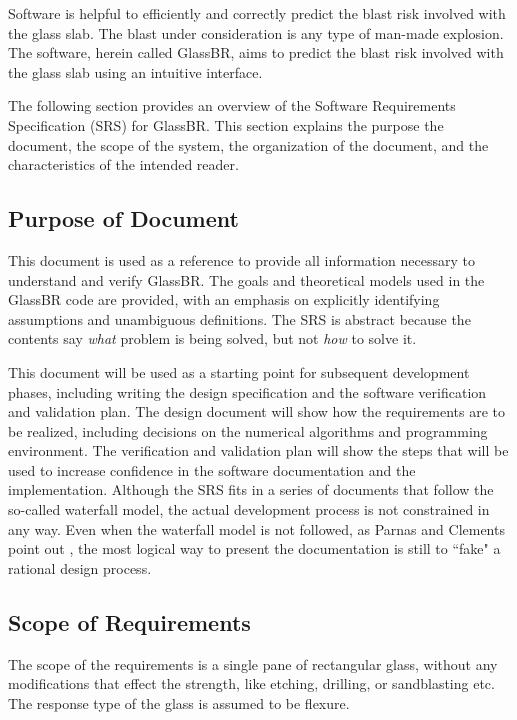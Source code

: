 \documentclass[12pt]{article}
\newcommand{\progname}{GlassBR}
\begin{document}
Software is helpful to efficiently and correctly predict the blast risk involved
with the glass slab. The blast under consideration is any type of man-made
explosion. The software, herein called \progname, aims to predict the blast risk
involved with the glass slab using an intuitive interface.  

The following section provides an overview of the Software Requirements Specification (SRS)
for \progname.  This section explains the purpose the document, the scope of 
the system, the organization of the document, and the characteristics of 
the intended reader. 

\subsection{Purpose of Document}

This document is used  as a reference to provide all information
necessary to understand and verify \progname{}. The goals and theoretical models
used in the \progname{} code are provided, with an emphasis on explicitly
identifying assumptions and unambiguous definitions.  The SRS is abstract
because the contents say \emph{what} problem is being solved, but not \emph{how}
to solve it.

This document will be used as a starting point for subsequent development
phases, including writing the design specification and the software verification
and validation plan.  The design document will show how the requirements are to
be realized, including decisions on the numerical algorithms and programming
environment.  The verification and validation plan will show the steps that will
be used to increase confidence in the software documentation and the
implementation. Although the SRS fits
in a series of documents that follow the so-called waterfall model, the actual development
process is not constrained in any way. Even when the waterfall model is not followed, as
Parnas and Clements point out \cite{ParnasAndClements1986}, the most logical way to present
the documentation is still to ``fake" a rational design process.

\subsection{Scope of Requirements} 

The scope of the requirements is a single pane of rectangular glass, without any
modifications that effect the strength, like etching, drilling, or sandblasting
etc.  The response type of the glass is assumed to be flexure.  
\end{document}
